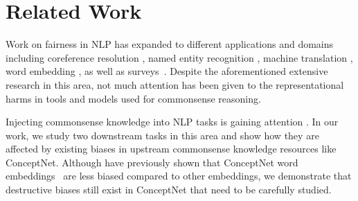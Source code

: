 \section{Related Work}
Work on fairness in NLP has expanded to different applications and domains including coreference resolution \cite{zhao2018gender}, named entity recognition \cite{mehrabi2020man}, machine translation \cite{font2019equalizing}, word embedding \cite{bolukbasi2016man,zhao2018learning,zhou2019examining}, as well as surveys~\cite{sun2019mitigating,blodgett-etal-2020-language,10.1145/3457607}.
Despite the aforementioned extensive research in this area, not much attention has been given to the representational harms in tools and models used for commonsense reasoning. 


Injecting commonsense knowledge into NLP tasks is gaining attention \cite{storks2019commonsense, chang-etal-2020-incorporating}. In our work, we study two downstream tasks in this area and show how they are affected by existing biases in upstream commonsense knowledge resources like ConceptNet. 
Although \citet{sweeney-najafian-2019-transparent} have previously shown that ConceptNet word embeddings~\cite{speer2017blog} are less biased compared to other embeddings, we demonstrate that destructive biases still exist in ConceptNet that need to be carefully studied. 

